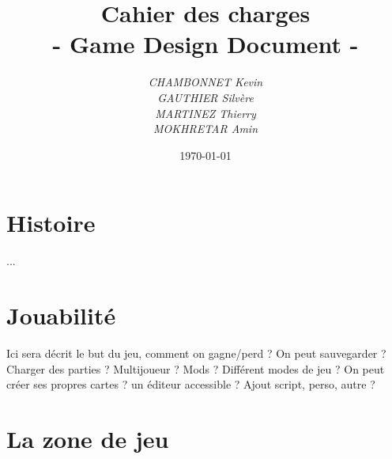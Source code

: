 \documentclass[a4paper]{article}
\title{Cahier des charges\\- Game Design Document -}
\author{\emph{CHAMBONNET Kevin}\\\emph{GAUTHIER Silvère}\\\emph{MARTINEZ Thierry}\\\emph{MOKHRETAR Amin}}
\date{\today}
\begin{document}
\maketitle




\section*{Histoire}

...

\section*{Jouabilité}

Ici sera décrit le but du jeu, comment on gagne/perd ?
On peut sauvegarder ? Charger des parties ?
Multijoueur ? Mods ?
Différent modes de jeu ?
On peut créer ses propres cartes ? un éditeur accessible ?
Ajout script, perso, autre ?

\section*{La zone de jeu}
\end{document}
